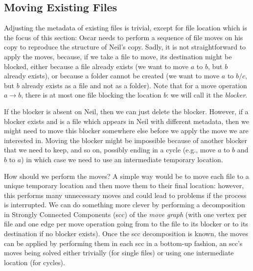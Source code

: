 \documentclass[twoside,envcountsame,runningheads]{llncs}
\begin{document}
\subsection{Moving Existing Files}
\label{sec:moving}

Adjusting the metadata of existing files is trivial, except for file location which is the focus of this section: Oscar needs to perform a sequence of file moves on his copy to reproduce the structure of Neil's copy. Sadly, it is not straightforward to apply the moves, because, if we take a file to move, its destination might be blocked, either because a file already exists (we want to move $a$ to $b$, but $b$ already exists), or because a folder cannot be created (we want to move $a$ to $b/c$, but $b$ already exists as a file and not as a folder). Note that for a move operation $a \rightarrow b$, there is at most one file blocking the location $b$: we will call it the \textit{blocker}.

If the blocker is absent on Neil, then we can just delete the blocker. However, if a blocker exists and is a file which appears in Neil with different metadata, then we might need to move this blocker somewhere else before we apply the move we are interested in. Moving the blocker might be impossible because of another blocker that we need to keep, and so on, possibly ending in a cycle (e.g., move $a$ to $b$ and $b$ to $a$) in which case we need to use an intermediate temporary location.

How should we perform the moves? A simple way would be to move each file to a unique temporary location and then move them to their final location: however, this performs many unnecessary moves and could lead to problems if the process is interrupted. We can do something more clever by performing a decomposition in Strongly Connected Components ({\sc scc}) of the \textit{move graph} (with one vertex per file and one edge per move operation going from to the file to its blocker or to its destination if no blocker exists).
Once the {\sc scc} decomposition is known, the moves can be applied by performing them in each {\sc scc} in a bottom-up fashion, an {\sc scc}'s moves being solved either trivially (for single files) or using one intermediate location (for cycles).
\end{document}
